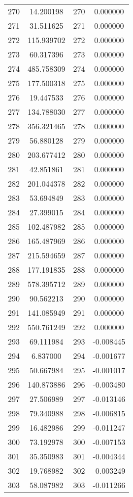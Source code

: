 \documentclass[12pt]{article}
\begin{document}
\begin{longtable}{@{}cccc@{}}
270 & 14.200198 & 270 & 0.000000 \\
271 & 31.511625 & 271 & 0.000000 \\
272 & 115.939702 & 272 & 0.000000 \\
273 & 60.317396 & 273 & 0.000000 \\
274 & 485.758309 & 274 & 0.000000 \\
275 & 177.500318 & 275 & 0.000000 \\
276 & 19.447533 & 276 & 0.000000 \\
277 & 134.788030 & 277 & 0.000000 \\
278 & 356.321465 & 278 & 0.000000 \\
279 & 56.880128 & 279 & 0.000000 \\
280 & 203.677412 & 280 & 0.000000 \\
281 & 42.851861 & 281 & 0.000000 \\
282 & 201.044378 & 282 & 0.000000 \\
283 & 53.694849 & 283 & 0.000000 \\
284 & 27.399015 & 284 & 0.000000 \\
285 & 102.487982 & 285 & 0.000000 \\
286 & 165.487969 & 286 & 0.000000 \\
287 & 215.594659 & 287 & 0.000000 \\
288 & 177.191835 & 288 & 0.000000 \\
289 & 578.395712 & 289 & 0.000000 \\
290 & 90.562213 & 290 & 0.000000 \\
291 & 141.085949 & 291 & 0.000000 \\
292 & 550.761249 & 292 & 0.000000 \\
293 & 69.111984 & 293 & -0.008445 \\
294 & 6.837000 & 294 & -0.001677 \\
295 & 50.667984 & 295 & -0.001017 \\
296 & 140.873886 & 296 & -0.003480 \\
297 & 27.506989 & 297 & -0.013146 \\
298 & 79.340988 & 298 & -0.006815 \\
299 & 16.482986 & 299 & -0.011247 \\
300 & 73.192978 & 300 & -0.007153 \\
301 & 35.350983 & 301 & -0.004344 \\
302 & 19.768982 & 302 & -0.003249 \\
303 & 58.087982 & 303 & -0.011266 \\

\end{longtable}
\end{document}

